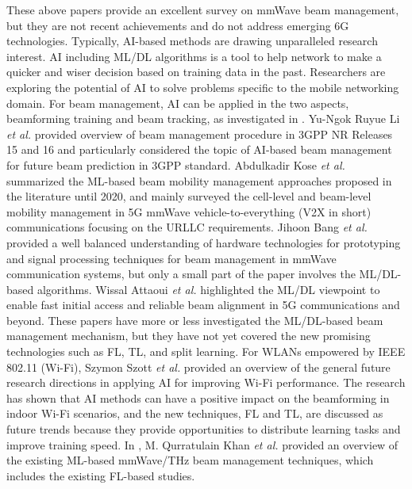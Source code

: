 \documentclass[journal,comsoc]{IEEEtran}
\begin{document}
These above papers provide an excellent survey on mmWave beam management, but they are not recent achievements and do not address emerging 6G technologies. Typically, AI-based methods are drawing unparalleled research interest. AI including ML/DL algorithms is a tool to help network to make a quicker and wiser decision based on training data in the past. Researchers are exploring the potential of AI to solve problems specific to the mobile networking domain. For beam management, AI can be applied in the two aspects, beamforming training and beam tracking, as investigated in \cite{Beam-Management-2020,Beam-Based-Mobility-V2X-Survey-2021,Millimeter-Wave-Hardware-Beam-Management-2021,Initial-Access-Beam-Alignment-mmWave-Terahertz-2022}. Yu-Ngok Ruyue Li \emph{et al.} \cite{Beam-Management-2020} provided overview of beam management procedure in 3GPP NR Releases 15 and 16 and particularly considered the topic of AI-based beam management for future beam prediction in 3GPP standard. Abdulkadir Kose \emph{et al.} \cite{Beam-Based-Mobility-V2X-Survey-2021} summarized the ML-based beam mobility management approaches proposed in the literature until 2020, and mainly surveyed the cell-level and beam-level mobility management in 5G mmWave vehicle-to-everything (V2X in short) communications focusing on the URLLC requirements. Jihoon Bang \emph{et al.} \cite{Millimeter-Wave-Hardware-Beam-Management-2021} provided a well balanced understanding of hardware technologies for prototyping and signal processing techniques for beam management in mmWave communication systems, but only a small part of the paper involves the ML/DL-based algorithms. Wissal Attaoui \emph{et al.} \cite{Initial-Access-Beam-Alignment-mmWave-Terahertz-2022} highlighted the ML/DL viewpoint to enable fast initial access and reliable beam alignment in 5G communications and beyond. These papers have more or less investigated the ML/DL-based beam management mechanism, but they have not yet covered the new promising technologies such as FL, TL, and split learning. For WLANs empowered by IEEE 802.11 (Wi-Fi), Szymon Szott \emph{et al.} \cite{Wi-Fi-Meets-ML-2022} provided an overview of the general future research directions in applying AI for improving Wi-Fi performance. The research has shown that AI methods can have a positive impact on the beamforming in indoor Wi-Fi scenarios, and the new  techniques, FL and TL, are discussed as future trends because they provide opportunities to distribute learning tasks and improve training speed. In \cite{Machine-Learning-Beam-management-survey-2023}, M. Qurratulain Khan \emph{et al.} provided an overview of the existing ML-based mmWave/THz beam management techniques, which includes the existing FL-based studies.
\end{document}
